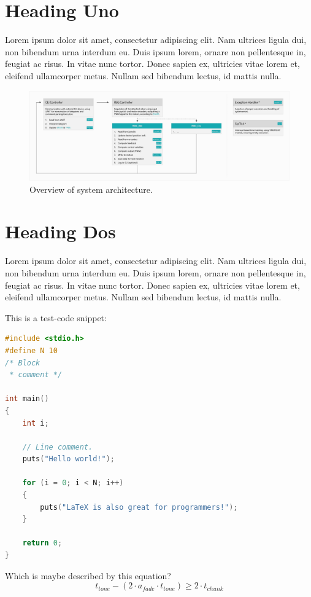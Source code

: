 \section{Heading Uno}
Lorem ipsum dolor sit amet, consectetur adipiscing elit. Nam ultrices ligula dui, non bibendum urna interdum eu. Duis ipsum lorem, ornare non pellentesque in, feugiat ac risus. In vitae nunc tortor. Donec sapien ex, ultricies vitae lorem et, eleifend ullamcorper metus. Nullam sed bibendum lectus, id mattis nulla.\medskip

\begin{figure}[H]
    \centering
    \includegraphics[width=\textwidth]{assets/img/mcu_architecture.jpg}
    \caption{Overview of system architecture.}
    \label{fig:mcu_architecture}
\end{figure}

\section{Heading Dos}
Lorem ipsum dolor sit amet, consectetur adipiscing elit. Nam ultrices ligula dui, non bibendum urna interdum eu. Duis ipsum lorem, ornare non pellentesque in, feugiat ac risus. In vitae nunc tortor. Donec sapien ex, ultricies vitae lorem et, eleifend ullamcorper metus. Nullam sed bibendum lectus, id mattis nulla.\medskip

\newpage
This is a test-code snippet:\medskip

\begin{lstlisting}[language=C]
#include <stdio.h>
#define N 10
/* Block
 * comment */

int main()
{
    int i;

    // Line comment.
    puts("Hello world!");
    
    for (i = 0; i < N; i++)
    {
        puts("LaTeX is also great for programmers!");
    }

    return 0;
}
\end{lstlisting}\medskip

Which is maybe described by this equation?
\begin{equation}
\label{eq:some_eq}
t_{tone} -(2 \cdot a_{fade} \cdot t_{tone}) \geq 2 \cdot t_{chunk} 
\end{equation}

